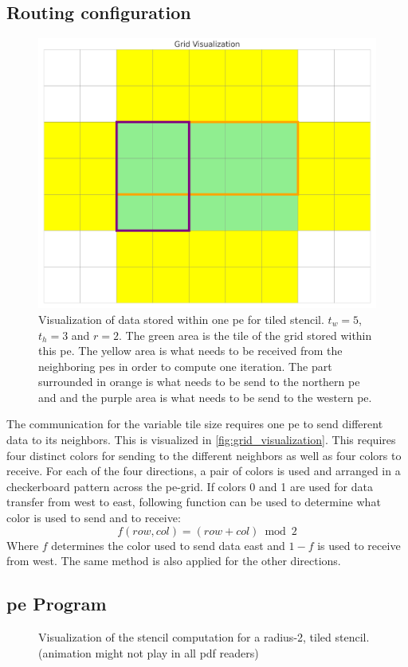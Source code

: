 \subsection{Routing configuration}
\begin{figure}
    \centering
    \includegraphics[width=0.5\linewidth]{grid_visualization.png}
    \caption{Visualization of data stored within one \ac{pe} for tiled stencil. $t_w=5$, $t_h=3$ and $r=2$. The green area is the tile of the grid stored within this \ac{pe}. The yellow area is what needs to be received from the neighboring \acp{pe} in order to compute one iteration. The part surrounded in orange is what needs to be send to the northern \ac{pe} and and the purple area is what needs to be send to the western \ac{pe}.}
    \label{fig:grid_visualization}
\end{figure}
The communication for the variable tile size requires one \ac{pe} to send different data to its neighbors. This is visualized in \autoref{fig:grid_visualization}. This requires four distinct colors for sending to the different neighbors as well as four colors to receive. For each of the four directions, a pair of colors is used and arranged in a checkerboard pattern across the \ac{pe}-grid.
If colors 0 and 1 are used for data transfer from west to east, following function can be used to determine what color is used to send and to receive:
\begin{equation}
    \label{eq:tiled_coloring_function}
    f(row, col)=(row+col) \bmod 2
\end{equation}
Where $f$ determines the color used to send data east and $1-f$ is used to receive from west. The same method is also applied for the other directions.

\subsection{\ac{pe} Program}

\begin{figure}
    \centering
    \caption{Visualization of the stencil computation for a radius-2, tiled stencil. (animation might not play in all pdf readers)}
    \label{fig:stencil_algorithm_animation}
\end{figure}


